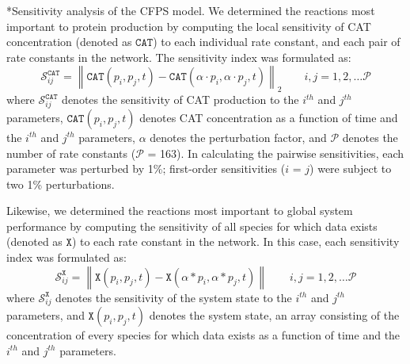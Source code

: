 \documentclass[12pt]{article}
\makeatletter
\renewcommand\subsection{\@startsection
	{subsection}{2}{0mm}
	{-0.05in}
	{-0.5\baselineskip}
	{\normalfont\normalsize\bfseries}}
\newcommand{\norm}[1]{\left\lVert#1\right\rVert}
\makeatother
\begin{document}
\subsection*{Sensitivity analysis of the CFPS model.}
We determined the reactions most important to protein production by computing the local sensitivity of CAT concentration (denoted as $\texttt{CAT}$)
to each individual rate constant, and each pair of rate constants in the network.
The sensitivity index was formulated as:
\begin{equation}\label{eqn:CAT-sensitivity}
    \mathcal{S}_{ij}^{\texttt{CAT}} = \norm{\texttt{CAT}(p_i,p_j,t)-\texttt{CAT}(\alpha \cdot p_i,\alpha \cdot p_j,t)}_{2}\qquad{i,j=1,2,\hdots\mathcal{P}}
\end{equation}
where $\mathcal{S}_{ij}^{\texttt{CAT}}$ denotes the sensitivity of CAT production to the $i^{th}$ and $j^{th}$ parameters,
$\texttt{CAT}(p_i,p_j,t)$ denotes CAT concentration as a function of time and the $i^{th}$ and $j^{th}$ parameters,
$\alpha$ denotes the perturbation factor, and $\mathcal{P}$ denotes the number of rate constants ($\mathcal{P}$ = 163).
In calculating the pairwise sensitivities, each parameter was perturbed by 1\%; first-order sensitivities ($i$ = $j$) were subject to two 1\% perturbations.

Likewise, we determined the reactions most important to global system performance by computing the sensitivity of all species for which data exists (denoted as $\texttt{X}$)
to each rate constant in the network.
In this case, each sensitivity index was formulated as:
\begin{equation}\label{eqn:system-sensitivity}
    \mathcal{S}_{ij}^{\texttt{X}}=\norm{\texttt{X}(p_i,p_j,t)-\texttt{X}(\alpha*p_i,\alpha*p_j,t)}\qquad{i,j=1,2,\hdots\mathcal{P}}
\end{equation}
where $\mathcal{S}_{ij}^{\texttt{X}}$ denotes the sensitivity of the system state to the $i^{th}$ and $j^{th}$ parameters,
and $\texttt{X}(p_i,p_j,t)$ denotes the system state, an array consisting of the concentration of every species for
which data exists as a function of time and the $i^{th}$ and $j^{th}$ parameters.

\end{document}
